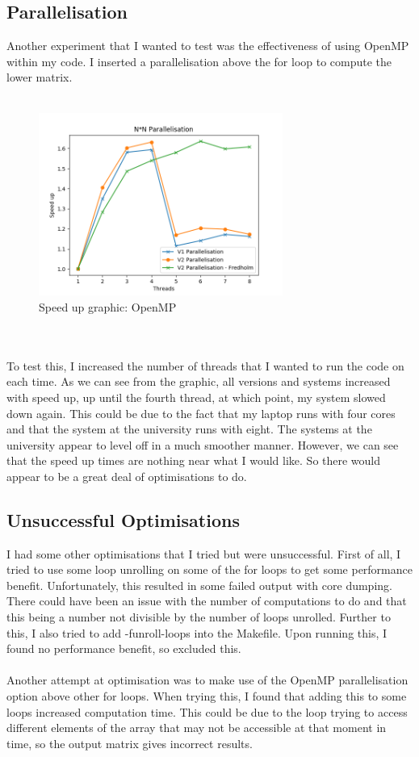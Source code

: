 \documentclass{article}
\begin{document}
\subsection{Parallelisation}
Another experiment that I wanted to test was the effectiveness of using OpenMP within my code. I inserted a parallelisation above the for loop to compute the lower matrix.
\\\\
\begin{figure}[htb]
\begin{center}
\includegraphics[width=8cm]{NN_speedup.png}
\caption{Speed up graphic: OpenMP}
\end{center}
\end{figure}
\\\\
To test this, I increased the number of threads that I wanted to run the code on each time. As we can see from the graphic, all versions and systems increased with speed up, up until the fourth thread, at which point, my system slowed down again. This could be due to the fact that my laptop runs with four cores and that the system at the university runs with eight. The systems at the university appear to level off in a much smoother manner. However, we can see that the speed up times are nothing near what I would like. So there would appear to be a great deal of optimisations to do.
\subsection{Unsuccessful Optimisations}
I had some other optimisations that I tried but were unsuccessful. First of all, I tried to use some loop unrolling on some of the for loops to get some performance benefit. Unfortunately, this resulted in some failed output with core dumping. There could have been an issue with the number of computations to do and that this being a number not divisible by the number of loops unrolled. Further to this, I also tried to add -funroll-loops into the Makefile. Upon running this, I found no performance benefit, so excluded this.
\\\\
Another attempt at optimisation was to make use of the OpenMP parallelisation option above other for loops. When trying this, I found that adding this to some loops increased computation time. This could be due to the loop trying to access different elements of the array that may not be accessible at that moment in time, so the output matrix gives incorrect results.
\end{document}
